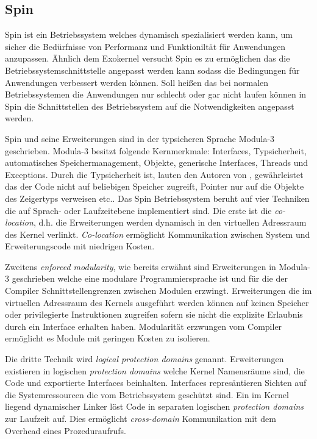 \documentclass[11pt,technote]{IEEEtran}
\begin{document}
        
    \subsection{Spin} \label{sec:other:spin}
      Spin ist ein Betriebssystem welches dynamisch spezialisiert werden kann, um sicher die Bed\"urfnisse von Performanz und Funktionilt\"at f\"ur
      Anwendungen anzupassen. \"Ahnlich dem Exokernel versucht Spin es zu erm\"oglichen das die Betriebssystemschnittstelle angepasst werden kann
      sodass die Bedingungen f\"ur Anwendungen verbessert werden k\"onnen. Soll hei\ss en das bei normalen Betriebssystemen die Anwendungen nur 
      schlecht oder gar nicht laufen k\"onnen in Spin die Schnittstellen des Betriebssystem auf die Notwendigkeiten angepasst werden.
      
      Spin und seine Erweiterungen sind in der typsicheren Sprache Modula-3 geschrieben. Modula-3 besitzt folgende Kernmerkmale: 
      Interfaces, Typsicherheit, automatisches Speichermanagement, Objekte, generische Interfaces, Threads und Exceptions.
      Durch die Typsicherheit ist, lauten den Autoren von \cite{inproc:spin}, gew\"ahrleistet das der Code nicht auf beliebigen Speicher zugreift,
      Pointer nur auf die Objekte des Zeigertyps verweisen etc..
      Das Spin Betriebssystem beruht auf vier Techniken die auf Sprach- oder Laufzeitebene implementiert sind.
      Die erste ist die \textit{co-location}, d.h. die Erweiterungen werden dynamisch in den virtuellen Adressraum des Kernel verlinkt.
      \textit{Co-location} erm\"oglicht Kommunikation zwischen System und Erweiterungscode mit niedrigen Kosten.
      
      Zweitens \textit{enforced modularity}, wie bereits erw\"ahnt sind Erweiterungen in Modula-3 geschrieben welche eine modulare
      Programmiersprache ist und f\"ur die der Compiler Schnittstellengrenzen zwischen Modulen erzwingt.
      Erweiterungen die im virtuellen Adressraum des Kernels ausgef\"uhrt werden k\"onnen auf keinen Speicher oder privilegierte Instruktionen 
      zugreifen sofern sie nicht die explizite Erlaubnis durch ein Interface erhalten haben.
      Modularit\"at erzwungen vom Compiler erm\"oglicht es Module mit geringen Kosten zu isolieren.
      
      Die dritte Technik wird \textit{logical protection domains} genannt. Erweiterungen existieren in logischen \textit{protection domains} welche Kernel
      Namensr\"aume sind, die Code und exportierte Interfaces beinhalten. Interfaces repres\"antieren Sichten auf die Systemressourcen
      die vom Betriebssystem gesch\"utzt sind. Ein im Kernel liegend dynamischer Linker l\"ost Code in separaten logischen 
      \textit{protection domains} zur Laufzeit auf. Dies erm\"oglicht \textit{cross-domain} Kommunikation mit dem Overhead eines Prozeduraufrufs.
      
\end{document}
